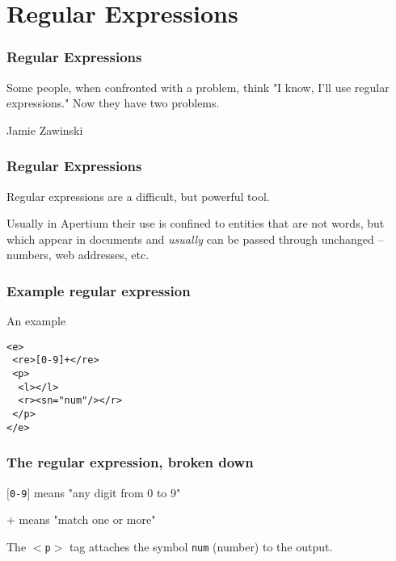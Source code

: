 \documentclass{beamer} %
\begin{document}
\section{Regular Expressions}
\begin{frame}
  \frametitle{Regular Expressions}
  \epigraph{Some people, when confronted with a problem, think "I know, I'll use regular expressions." Now they have two problems.}{Jamie Zawinski}
\end{frame}
\begin{frame}
  \frametitle{Regular Expressions}
  Regular expressions are a difficult, but powerful tool.

  Usually in Apertium their use is confined to entities that are not words, but which appear in documents and {\it usually}
  can be passed through unchanged -- numbers, web addresses, etc.
\end{frame}
\begin{frame}
  \frametitle{Example regular expression}

  \begin{exampleblock}{An example}
    \begin{footnotesize}
    \begin{alltt}
      <e> \\
      ~<re>[0-9]+</re> \\
      ~<p> \\
      ~~<l></l> \\
      ~~<r><s n="num"/></r> \\
      ~</p> \\
      </e> \\
    \end{alltt}
    \end{footnotesize}
  \end{exampleblock}
\begin{frame}
\end{frame}
  \frametitle{The regular expression, broken down}

  {\tt $[$0-9$]$} means "any digit from 0 to 9"

  {\tt $+$} means "match one or more"
  
  The {\tt $<$p$>$} tag attaches the symbol {\tt num} (number) to 
  the output.
\end{frame}
\end{document}
